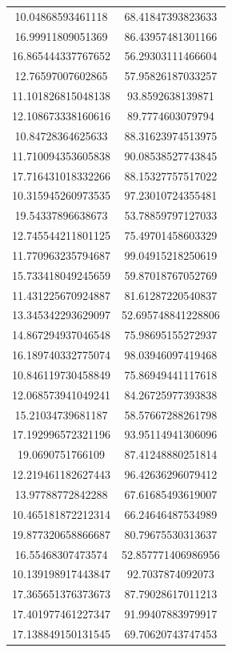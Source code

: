 \begin{table}
\begin{tabular}{cc}
10.04868593461118 & 68.41847393823633 \\
16.99911809051369 & 86.43957481301166 \\
16.865444337767652 & 56.29303111466604 \\
12.76597007602865 & 57.95826187033257 \\
11.101826815048138 & 93.8592638139871 \\
12.108673338160616 & 89.7774603079794 \\
10.84728364625633 & 88.31623974513975 \\
11.710094353605838 & 90.08538527743845 \\
17.716431018332266 & 88.15327757517022 \\
10.315945260973535 & 97.23010724355481 \\
19.54337896638673 & 53.78859797127033 \\
12.745544211801125 & 75.49701458603329 \\
11.770963235794687 & 99.04915218250619 \\
15.733418049245659 & 59.87018767052769 \\
11.431225670924887 & 81.61287220540837 \\
13.345342293629097 & 52.695748841228806 \\
14.867294937046548 & 75.98695155272937 \\
16.189740332775074 & 98.03946097419468 \\
10.846119730458849 & 75.86949441117618 \\
12.068573941049241 & 84.26725977393838 \\
15.21034739681187 & 58.57667288261798 \\
17.192996572321196 & 93.95114941306096 \\
19.0690751766109 & 87.41248880251814 \\
12.219461182627443 & 96.42636296079412 \\
13.97788772842288 & 67.61685493619007 \\
10.465181872212314 & 66.24646487534989 \\
19.877320658866687 & 80.79675530313637 \\
16.55468307473574 & 52.857771406986956 \\
10.139198917443847 & 92.7037874092073 \\
17.365651376373673 & 87.79028617011213 \\
17.401977461227347 & 91.99407883979917 \\
17.138849150131545 & 69.70620743747453 \\

\end{tabular}
\end{table}
